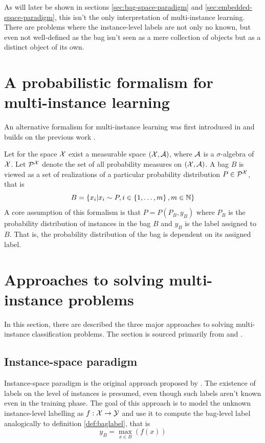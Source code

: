 As will later be shown in sections \ref{sec:bag-space-paradigm} and \ref{sec:embedded-space-paradigm}, this isn't the only interpretation of multi-instance learning. There are problems where the instance-level labels are not only no known, but even not well-defined as the bag isn't seen as a mere collection of objects but as a distinct object of its own.

\section{A probabilistic formalism for multi-instance learning}\label{sec:stochastic-formalism}
An alternative formalism for multi-instance learning was first introduced in \cite{pevny_using_2017} and builds on the previous work \cite{muandet_learning_2012}.

Let for the space \( \mathcal{X} \) exist a measurable space \( \left( \mathcal{X}, \mathcal{A} \right) \), where \( \mathcal{A} \) is a \( \sigma \)-algebra of \( \mathcal{X} \). Let \( \mathcal{P}^\mathspace{X} \) denote the set of all probability measures on \( \left( \mathcal{X}, \mathcal{A} \right) \). A bag \( B \) is viewed as a set of realizations of a particular probability distribution \( P \in \mathcal{P}^\mathspace{X} \), that is
\[ B = \left\{ x_i \middle| x_i \sim P, i \in \left\{ 1, \dots, m \right\}, m \in \mathbb{N} \right\} \]
A core assumption of this formalism is that \( P = P \left( P_B, y_B \right) \) where \( P_B \) is the probability distribution of instances in the bag \( B \) and \( y_B \) is the label assigned to \( B \). That is, the probability distribution of the bag is dependent on its assigned label.

\section{Approaches to solving multi-instance problems}
In this section, there are described the three major approaches to solving multi-instance classification problems. The section is sourced primarily from \cite{pevny_using_2017} and \cite{pevny_discriminative_2016}.

\subsection{Instance-space paradigm}
Instance-space paradigm is the original approach proposed by \cite{dietterich_solving_1997}. The existence of labels on the level of instances is presumed, even though such labels aren't known even in the training phase. The goal of this approach is to model the unknown instance-level labelling as \( f : \mathcal{X} \to \mathcal{Y} \) and use it to compute the bag-level label analogically to definition \ref{def:baglabel}, that is
\[ y_B = \max_{x \in B } \left( f \left( x \right) \right) \]

